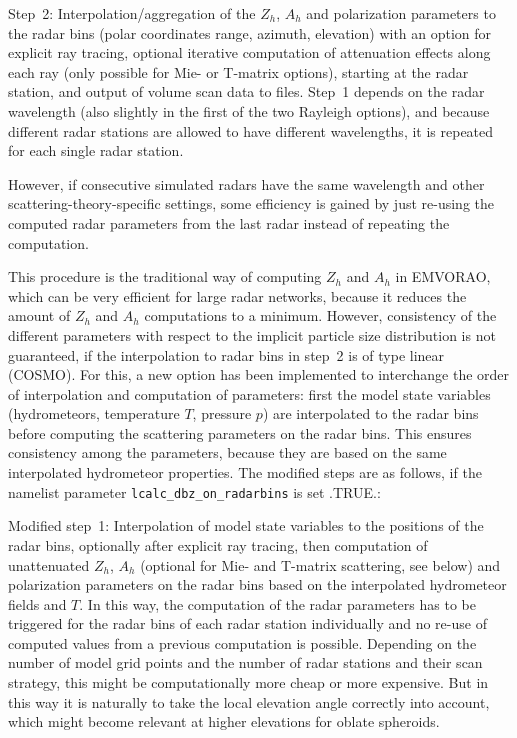 \documentclass[10pt,a4paper,twoside,headinclude,footinclude,parskip=half]{scrartcl}
\newcommand{\paramform}[1]{\mbox{\texttt{#1}}\xspace}%
\begin{document}
Step~2: Interpolation/aggregation of the $Z_h$, $A_h$ and polarization parameters to the
radar bins (polar coordinates range, azimuth, elevation) with an option for explicit ray tracing, optional iterative computation
of attenuation effects along each ray (only possible for Mie- or T-matrix options), starting at the radar station, and output of volume
scan data to files. Step~1 depends on the radar wavelength (also slightly in the first of the two Rayleigh options), and because different
radar stations are allowed to have different wavelengths, it is repeated for each single
radar station.

However, if consecutive simulated radars have the same wavelength and other scattering-theory-specific
settings, some efficiency is gained
by just re-using the computed radar parameters from the last radar instead of repeating the computation.

This procedure is the traditional way of computing $Z_h$ and $A_h$ in EMVORAO, which can be very efficient for large radar networks, because it
reduces the amount of $Z_h$ and $A_h$ computations to a minimum. However, consistency of the different parameters with respect to the implicit particle size distribution is not guaranteed,
if the interpolation to radar bins in step~2 is of type linear (COSMO).
For this, a new option has been implemented to interchange the order of interpolation and computation of parameters:
first the model state variables (hydrometeors, temperature $T$, pressure $p$) are interpolated to the radar bins before computing the scattering parameters on the radar bins.
This ensures consistency among the parameters, because they are based on the same interpolated hydrometeor properties. The modified steps
are as follows, if the namelist parameter \paramform{lcalc_dbz_on_radarbins} is set .TRUE.:

Modified step~1: Interpolation of model state variables to the positions of the radar bins, optionally after explicit ray tracing, then computation of
unattenuated $Z_h$, $A_h$ (optional for Mie- and T-matrix scattering, see below) and polarization parameters
on the radar bins based on the interpolated hydrometeor fields and $T$. In this way, the computation of the radar parameters
has to be triggered for the radar bins of each radar station individually and no re-use of computed values from a previous computation is possible.
Depending on the number of model grid points and the number of radar stations and their scan strategy, this might be computationally more cheap or more expensive.
But in this way it is naturally to take the local elevation angle correctly into account, which might become relevant at higher elevations
for oblate spheroids.
\end{document}
